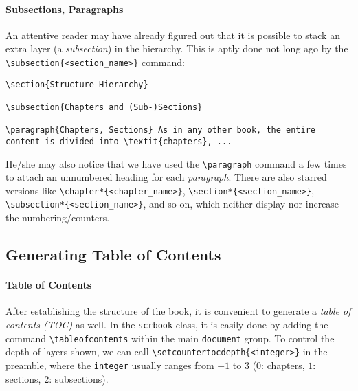 \paragraph{Subsections, Paragraphs} An attentive reader may have already figured out that it is possible to stack an extra layer (a \textit{subsection}) in the hierarchy. This is aptly done not long ago by the \texttt{\textbackslash subsection\{<section\_name>\}} command:
\begin{lstlisting}
\section{Structure Hierarchy}

\subsection{Chapters and (Sub-)Sections}

\paragraph{Chapters, Sections} As in any other book, the entire content is divided into \textit{chapters}, ...
\end{lstlisting}
He/she may also notice that we have used the \texttt{\textbackslash paragraph} command a few times to attach an unnumbered heading for each \textit{paragraph}. There are also starred versions like \texttt{\textbackslash chapter*\{<chapter\_name>\}}, \texttt{\textbackslash section*\{<section\_name>\}}, \texttt{\textbackslash subsection*\{<section\_name>\}}, and so on, which neither display nor increase the numbering/counters.

\subsection{Generating Table of Contents}

\paragraph{Table of Contents}
After establishing the structure of the book, it is convenient to generate a \textit{table of contents (TOC)} as well. In the \verb|scrbook| class, it is easily done by adding the command \texttt{\textbackslash tableofcontents} within the main \verb|document| group. To control the depth of layers shown, we can call \texttt{\textbackslash setcounter{tocdepth}\allowbreak\{<integer>\}} in the preamble, where the \verb|integer| usually ranges from $-1$ to $3$ ($0$: chapters, $1$: sections, $2$: subsections).

